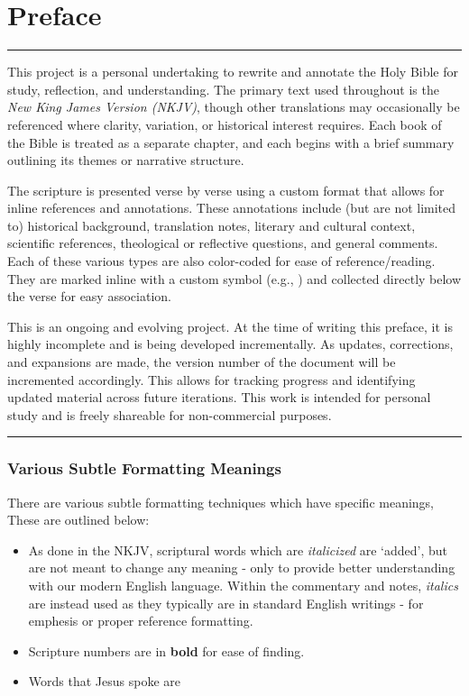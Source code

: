 \chapter{Preface}
\rule{\textwidth}{0.5pt}    %
\thispagestyle{fancy}

This project is a personal undertaking to rewrite and annotate the Holy Bible for study, reflection, and understanding. The primary text used throughout is the \textit{New King James Version (NKJV)}, though other translations may occasionally be referenced where clarity, variation, or historical interest requires. Each book of the Bible is treated as a separate chapter, and each begins with a brief summary outlining its themes or narrative structure.

\tab The scripture is presented verse by verse using a custom format that allows for inline references and annotations. These annotations include (but are not limited to) historical background, translation notes, literary and cultural context, scientific references, theological or reflective questions, and general comments. Each of these various types are also color-coded for ease of reference/reading. They are marked inline with a custom symbol (e.g., \vmark{$\star$}) and collected directly below the verse for easy association.

\tab This is an ongoing and evolving project. At the time of writing this preface, it is highly incomplete and is being developed incrementally. As updates, corrections, and expansions are made, the version number of the document will be incremented accordingly. This allows for tracking progress and identifying updated material across future iterations. This work is intended for personal study and is freely shareable for non-commercial purposes.

\rule{\textwidth}{0.5pt}    %


\subsection*{Various Subtle Formatting Meanings}

There are various subtle formatting techniques which have specific meanings, These are outlined below:
\begin{itemize}
	\item As done in the NKJV, scriptural words which are \textit{italicized} are `added', but are not meant to change any meaning - only to provide better understanding with our modern English language. Within the commentary and notes, \textit{italics} are instead used as they typically are in standard English writings - for emphesis or proper reference formatting.
	\item Scripture numbers are in \textbf{bold} for ease of finding.
	\item Words that Jesus spoke are 
\end{itemize}




